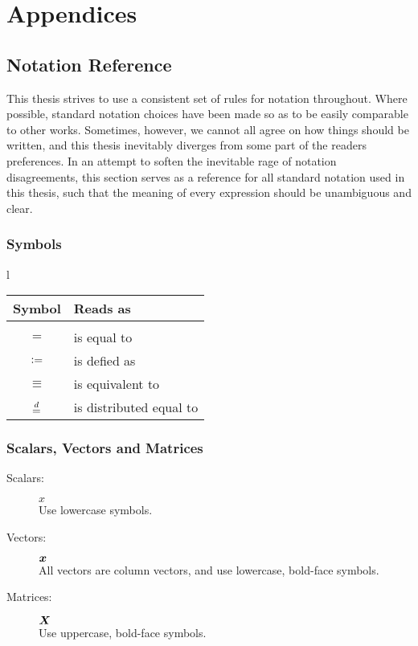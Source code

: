 \documentclass[Thesis.tex]{subfiles}
\begin{document}
\chapter{Appendices}
\renewcommand{\thesection}{\Alph{section}}
\renewcommand{\thesubsection}{\Alph{section}.\Roman{subsection}}

\section{Notation Reference}
\label{app:notation-reference}

This thesis strives to use a consistent set of rules for notation throughout.
Where possible, standard notation choices have been made so as to be easily
comparable to other works. Sometimes, however, we cannot all agree on how things
should be written, and this thesis inevitably diverges from some part of the
readers preferences. In an attempt to soften the inevitable rage of notation
disagreements, this section serves as a reference for all standard
notation used in this thesis, such that the meaning of every expression should
be unambiguous and clear.

\subsection{Symbols}l
\begin{center}
\begin{tabular}{cl}
  Symbol & Reads as\\
  \hline\\
  $=$ & is equal to\\
  $\vcentcolon=$ & is defied as\\
  $\equiv$ & is equivalent to\\
  $\overset{d}{=}$ & is distributed equal to
\end{tabular}
\end{center}

\subsection{Scalars, Vectors and Matrices}

\begin{description}
\item[Scalars:] $x$\hfill\\
  Use lowercase symbols.
\item[Vectors:] $\bm{x}$ \hfill\\
  All vectors are column vectors, and use lowercase, bold-face symbols.
\item[Matrices:] $\bm{X}$ \hfill \\
  Use uppercase, bold-face symbols.
\end{description}
\end{document}
